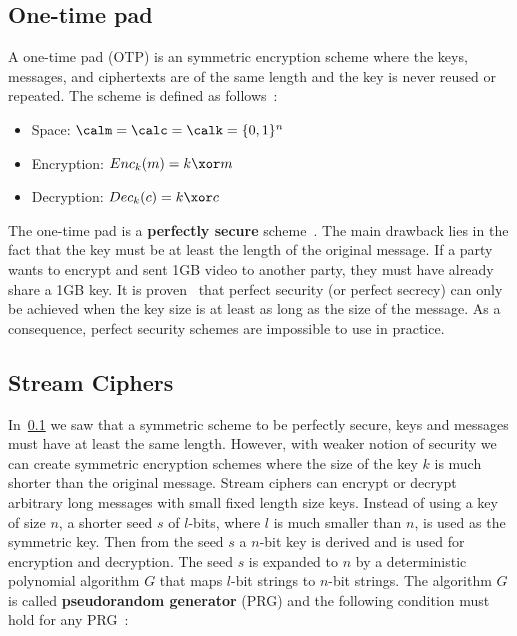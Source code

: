 \subsection{One-time pad}
\label{preliminaries:sym:otp}

A one-time pad (OTP) is an symmetric encryption scheme where the keys, messages, and ciphertexts are of the same length and the key is never reused or repeated. The scheme is defined as follows~\cite{kiagias:crypto, boneh_crypto}:

\begin{itemize}
  \item Space: $\calm = \calc = \calk = \{0, 1\}^{n}$
  \item Encryption: $Enc_k(m) = k \xor m$
  \item Decryption: $Dec_k(c) = k \xor c$
\end{itemize}

The one-time pad is a \textbf{perfectly secure} scheme~\cite{kiagias:crypto, boneh_crypto}. The main drawback lies in the fact that the key must be at least the length of the original message. If a party wants to encrypt and sent 1GB video to another party, they must have already share a 1GB key. It is proven~\cite{shannon_otp} that perfect security (or perfect secrecy) can only be achieved when the key size is at least as long as the size of the message. As a consequence, perfect security schemes are impossible to use in practice.

\subsection{Stream Ciphers}
\label{preliminaries:sym:stream}

In~\ref{preliminaries:sym:otp} we saw that a symmetric scheme to be perfectly secure, keys and messages must have at least the same length. However, with weaker notion of security we can create symmetric encryption schemes where the size of the key $k$ is much shorter than the original message. Stream ciphers can encrypt or decrypt arbitrary long messages with small fixed length size keys. Instead of using a key of size $n$, a shorter seed $s$ of $l$-bits, where $l$ is much smaller than $n$, is used as the symmetric key. Then from the seed $s$ a $n$-bit key is derived and is used for encryption and decryption. The seed $s$ is expanded to $n$ by a deterministic polynomial algorithm $G$ that maps $l$-bit strings to $n$-bit strings. The algorithm $G$ is called \textbf{pseudorandom generator} (PRG) and the following condition must hold for any PRG~\cite{Katz:2014:IMC:2700550}:

